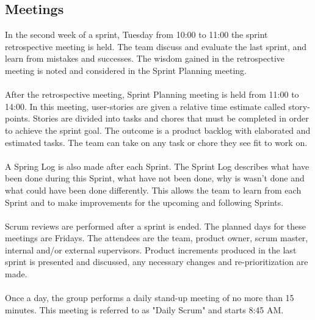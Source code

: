 \subsection{Meetings}
In the second week of a sprint, Tuesday from 10:00 to 11:00 the sprint retrospective meeting is held. The team discuss and evaluate the last sprint, and learn from mistakes and successes. The wisdom gained in the retrospective meeting is noted and considered in the Sprint Planning meeting.
\\\\
After the retrospective meeting, Sprint Planning meeting is held from 11:00 to 14:00. In this meeting, user-stories are given a relative time estimate called  story-points. Stories are divided into  tasks and chores that must be completed in order to achieve the sprint goal. The outcome is a product backlog with elaborated and estimated tasks. The team can take on any task or chore they see fit to work on. 
\\\\
A Spring Log is also made after each Sprint. The Sprint Log describes what have been done during this Sprint, what have not been done, why is wasn't done and what could have been done differently. This allows the team to learn from each Sprint and to make improvements for the upcoming and following Sprints. 
\\\\
Scrum reviews are performed after a sprint is ended. The planned days for these meetings are Fridays. The attendees are the team, product owner, scrum master, internal and/or external supervisors. Product increments produced in the last sprint is presented and discussed, any necessary changes and re-prioritization are made.
\\\\
Once a day, the group performs a daily stand-up meeting of no more than 15 minutes. This meeting is referred to as "Daily Scrum" and starts 8:45 AM. 









